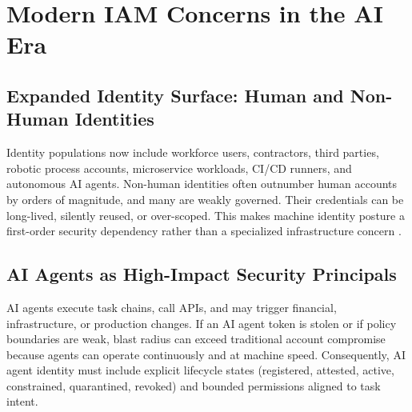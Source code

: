 \documentclass[11pt]{article}
\begin{document}
\section{Modern IAM Concerns in the AI Era}
\subsection{Expanded Identity Surface: Human and Non-Human Identities}
Identity populations now include workforce users, contractors, third parties, robotic process accounts, microservice workloads, CI/CD runners, and autonomous AI agents. Non-human identities often outnumber human accounts by orders of magnitude, and many are weakly governed. Their credentials can be long-lived, silently reused, or over-scoped. This makes machine identity posture a first-order security dependency rather than a specialized infrastructure concern \cite{azure_workload_identity,aws_iam_roles_anywhere}.

\subsection{AI Agents as High-Impact Security Principals}
AI agents execute task chains, call APIs, and may trigger financial, infrastructure, or production changes. If an AI agent token is stolen or if policy boundaries are weak, blast radius can exceed traditional account compromise because agents can operate continuously and at machine speed. Consequently, AI agent identity must include explicit lifecycle states (registered, attested, active, constrained, quarantined, revoked) and bounded permissions aligned to task intent.
\end{document}
